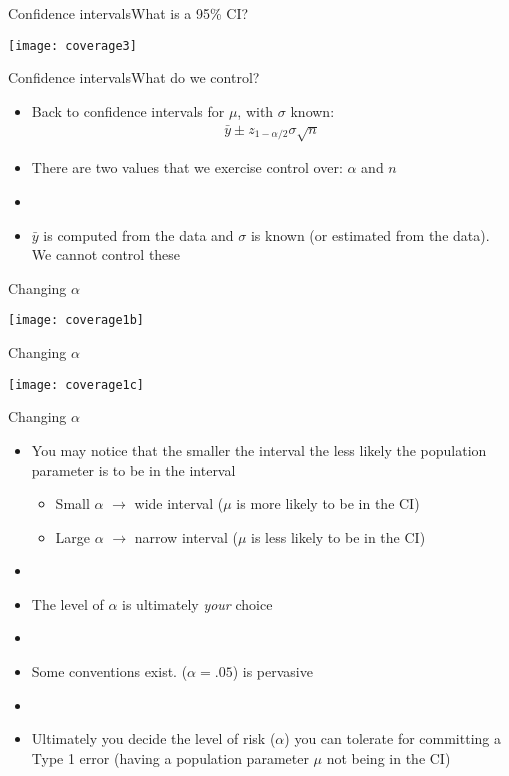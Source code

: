 \documentclass[xcolor=dvipsnames]{beamer}
\begin{document}
\begin{frame}{Confidence intervals}{What is a 95\% CI?}
\begin{center}
	\texttt{[image: coverage3]}
\end{center}
\end{frame}

\begin{frame}{Confidence intervals}{What do we control?}
\begin{itemize}
	\item Back to confidence intervals for $\mu$, with $\sigma$ known:
	\begin{gather*}
	\bar{y}\pm z_{1-\alpha/2} \sigma \sqrt{n}
	\end{gather*}
	\item There are two values that we exercise control over: $\alpha$ and $n$
	\item[]
	\item $\bar{y}$ is computed from the data and $\sigma$ is known (or estimated from the data). We cannot control these
\end{itemize}
\end{frame}

\begin{frame}{Changing $\alpha$}
	\begin{center}
			\texttt{[image: coverage1b]}
	\end{center}
\end{frame}

\begin{frame}{Changing $\alpha$}
\begin{center}
	\texttt{[image: coverage1c]}
\end{center}
\end{frame}

\begin{frame}{Changing $\alpha$}
\begin{itemize}
	\item You may notice that the smaller the interval the less likely the population parameter is to be in the interval 
	\begin{itemize}
		\item Small $\alpha$ $\rightarrow$ wide interval ($\mu$ is more likely to be in the CI)
		\item Large $\alpha$ $\rightarrow$ narrow interval ($\mu$ is less likely to be in the CI)
	\end{itemize}
	\item[]
	\item The level of $\alpha$ is ultimately \emph{your} choice
	\item[]
	\item Some conventions exist. ($\alpha = .05$) is pervasive
	\item[]
	\item Ultimately you decide the level of risk ($\alpha$) you can tolerate for committing a Type 1 error (having a population parameter $\mu$ not being in the CI)
\end{itemize}
\end{frame}
\end{document}

